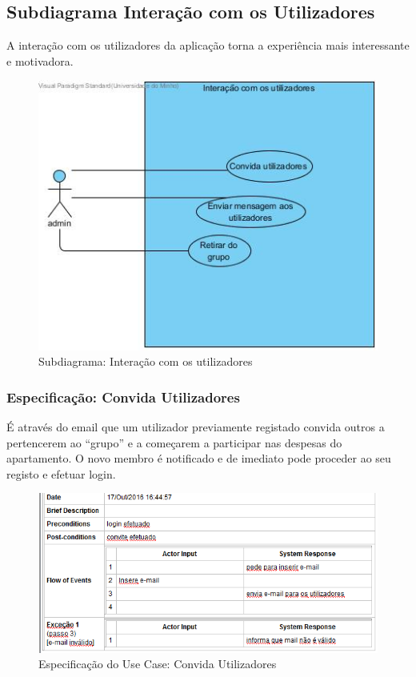 \subsection{Subdiagrama Interação com os Utilizadores}
A interação com os utilizadores da aplicação torna a experiência mais interessante e motivadora. 
\begin{figure}[htb!]
	\centering
	\includegraphics[scale=0.6]{imagens/UseCase/InteracaoComOsUtilizadores}  
	\caption{Subdiagrama: Interação com os utilizadores }  
\end{figure}

\subsubsection{Especificação: Convida Utilizadores }
É através do email que um utilizador previamente registado convida outros a pertencerem ao “grupo” e a começarem a participar nas despesas do apartamento. O novo membro é notificado e de imediato pode proceder ao seu registo e efetuar login. 

\begin{figure}[htb!]
	\centering
	\includegraphics[scale=0.7]{imagens/Especificacoes/convidautilizadores}  
	\caption{Especificação do Use Case: Convida Utilizadores}  
\end{figure}


